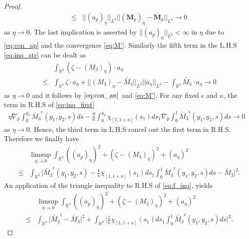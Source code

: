 \documentclass{article}
\def \Mvec{\mathbf{M}}
\begin{document}
\begin{proof}
\begin{eqnarray}
&\le&||\left(a_p\right)_{\eta}||_{L^2}||\left(\Mvec_p\right)_{\eta}-\check{\Mvec_p}||_{L^2}\rightarrow 0
\end{eqnarray}
as $\eta\rightarrow 0$. The last implication is asserted by $||\left(a_p\right)_{\eta}||_{L^2}<\infty$ in $\eta$ due to \eqref{eq:con_ap} and the convergence \eqref{eq:M'}.
Similarly the fifth term in the L.H.S  \eqref{eq:inq_str} can be dealt as
\begin{eqnarray}
& &\int_{\mathbb R^3}\left(\zeta-\left(M_3\right)_{\eta}\right)\cdot a_{\eta}\nonumber\\
&\le&\int_{\mathbb R^3}\zeta\cdot a_{\eta} + ||\left(M_3\right)_{\eta} - \check{M_3}||_{L^2}||a_{\eta}||_{L^2} - \int_{\mathbb R^3}\check{M_3}\cdot a_{\eta}\rightarrow 0
\end{eqnarray}
as $\eta\rightarrow 0$ and it follows by $\eqref{eq:con_an}$ and \eqref{eq:M'}. For any fixed $\epsilon$ and $\kappa$, the term in R.H.S of \eqref{eq:inq_first}
\begin{eqnarray}
\eta\nabla_p\int_{0}^{y_3}{\check{M_3}}^{\epsilon}\left(y_1, y_2, s\right)ds-\frac{\eta}{\kappa}\int_{0}^{y_3}\chi_{[1, 1+\kappa]}\left(s_1\right)ds_1\nabla_p\int_{0}^{1}{\check{M_3}}^{\epsilon}\left(y_1, y_2, s\right)ds\rightarrow 0
\end{eqnarray}
as $\eta\rightarrow 0$. Hence, the third term in L.H.S cancel out the first term in R.H.S. Therefore we finally have
\begin{eqnarray}
& &\limsup_{\eta\rightarrow 0}\int_{\mathbb R^3}\left(\left(a_p\right)_{\eta}\right)^2+\left(\zeta-\left(M_3\right)_{\eta}\right)^2 + \left(a_{\eta}\right)^2\nonumber\\
&\le&\int_{\mathbb R^3}\bigg|{\check{M_3}}^{\epsilon}\left(y_1, y_2, s\right)-\frac{1}{\kappa}\chi_{[1, 1+\kappa]}\left(s_1\right)ds_1\int_{0}^{1}{\check{M_3}}^{\epsilon}\left(y_1, y_2, s\right)ds-\check{M_3}\bigg|^2.\label{eq:f_inq}
\end{eqnarray}
An application of the triangle inequality to R.H.S of \eqref{eq:f_inq}, yields
\begin{eqnarray}
& &\limsup_{\eta\rightarrow 0}\int_{\mathbb R^3}\left(\left(a_p\right)_{\eta}\right)^2+\left(\zeta-\left(M_3\right)_{\eta}\right)^2 + \left(a_{\eta}\right)^2\nonumber\\
&\le&\int_{\mathbb R^3}\bigg|{\check{M_3}}^{\epsilon}-\check{M_3}\bigg|^2+\int_{\mathbb R^3}\bigg|\frac{1}{\kappa}\chi_{[1, 1+\kappa]}\left(s_1\right)ds_1\int_{0}^{1}{\check{M_3}}^{\epsilon}\left(y_1, y_2, s\right)ds\bigg|^2.\label{eq:f_inq2}
\end{eqnarray}

\end{proof}
\end{document}
